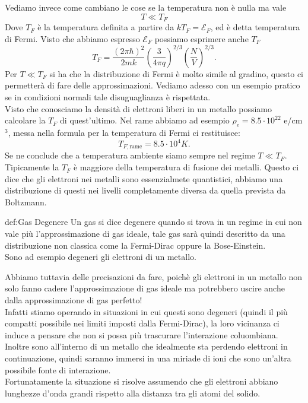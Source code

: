 Vediamo invece come cambiano le cose se la temperatura non è nulla ma vale 
\[
T \ll T_{F} 
\]
Dove $T_{F}$ è la temperatura definita a partire da $kT_{F} = \mathcal{E} _{F}$, ed è detta temperatura di Fermi. Visto che abbiamo espresso $\mathcal{E} _{F}$ possiamo esprimere anche $T_{F}$
\[
	T_{F} = \frac{\left( 2\pi \hbar  \right)^2}{2m k} \left( \frac{3}{4\pi q} \right)^{2 /3} \left( \frac{N}{V} \right) ^{2 /3}
.\] 
Per $T\ll T_{F}$ si ha che la distribuzione di Fermi è molto simile al gradino, questo ci permetterà di fare delle approssimazioni. Vediamo adesso con un esempio pratico se in condizioni normali tale disuguaglianza è rispettata.\\
Visto che conosciamo la densità di elettroni liberi in un metallo possiamo calcolare la $T_{F}$ di quest'ultimo. Nel rame abbiamo ad esempio $\rho _{e}= 8.5 \cdot 10^{22}$ e/cm$^3$, messa nella formula per la temperatura di Fermi ci restituisce:
\[
	T_{F, \text{rame}} = 8.5 \cdot 10^{4} K
.\] 
Se ne conclude che a temperatura ambiente siamo sempre nel regime $T \ll T_{F}$.\\
Tipicamente la $T_{F}$ è maggiore della temperatura di fusione dei metalli. Questo ci dice che gli elettroni nei metalli sono essenzialmete quantistici, abbiamo una distribuzione di questi nei livelli completamente diversa da quella prevista da Boltzmann.
\begin{defn}{def:Gas Degenere}
	Un gas si dice degenere quando si trova in un regime in cui non vale più l'approssimazione di gas ideale, tale gas sarà quindi descritto da una distribuzione non classica come la Fermi-Dirac oppure la Bose-Einstein.\\
	Sono ad esempio degeneri gli elettroni di un metallo.
\end{defn}
Abbiamo tuttavia delle precisazioni da fare, poichè gli elettroni in un metallo non solo fanno cadere l'approssimazione di gas ideale ma potrebbero uscire anche dalla approssimazione di gas perfetto!\\
Infatti stiamo operando in situazioni in cui questi sono degeneri (quindi il più compatti possibile nei limiti imposti dalla Fermi-Dirac), la loro vicinanza ci induce a pensare che non si possa più trascurare l'interazione coluombiana. Inoltre sono all'interno di un metallo che idealmente sta perdendo elettroni in continuazione, quindi saranno immersi in una miriade di ioni che sono un'altra possibile fonte di interazione.\\
Fortunatamente la situazione si risolve assumendo che gli elettroni abbiano lunghezze d'onda grandi rispetto alla distanza tra gli atomi del solido.\\
